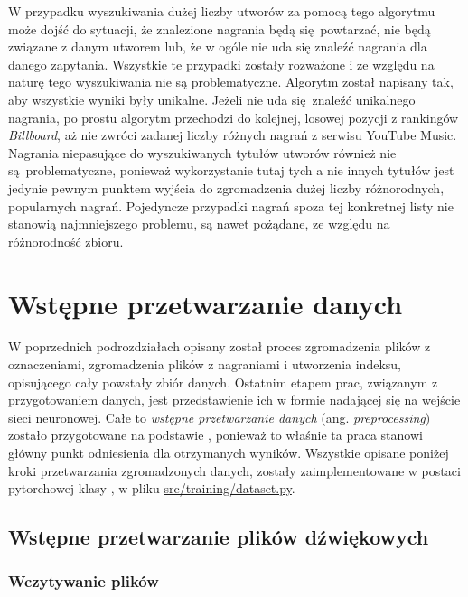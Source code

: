W przypadku wyszukiwania dużej liczby utworów za pomocą tego algorytmu może dojść do sytuacji, że znalezione nagrania będą się powtarzać, nie będą związane z danym utworem lub, że w ogóle nie uda się znaleźć nagrania dla danego zapytania. Wszystkie te przypadki zostały rozważone i ze względu na naturę tego wyszukiwania nie są problematyczne. Algorytm został napisany tak, aby wszystkie wyniki były unikalne. Jeżeli nie uda się znaleźć unikalnego nagrania, po prostu algorytm przechodzi do kolejnej, losowej pozycji z rankingów \emph{Billboard}, aż nie zwróci zadanej liczby różnych nagrań z serwisu YouTube Music. Nagrania niepasujące do wyszukiwanych tytułów utworów również nie są problematyczne, ponieważ wykorzystanie tutaj tych a nie innych tytułów jest jedynie pewnym punktem wyjścia do zgromadzenia dużej liczby różnorodnych, popularnych nagrań. Pojedyncze przypadki nagrań spoza tej konkretnej listy nie stanowią najmniejszego problemu, są nawet pożądane, ze względu na różnorodność zbioru.

\section{Wstępne przetwarzanie danych} \label{sec:preprocessing}

W poprzednich podrozdziałach opisany został proces zgromadzenia plików z oznaczeniami, zgromadzenia plików z nagraniami i utworzenia indeksu, opisującego cały powstały zbiór danych. Ostatnim etapem prac, związanym z przygotowaniem danych, jest przedstawienie ich w formie nadającej się na wejście sieci neuronowej. Całe to \emph{wstępne przetwarzanie danych} (ang. \emph{preprocessing}) zostało przygotowane na podstawie \cite{park_bi-directional_2019}, ponieważ to właśnie ta praca stanowi główny punkt odniesienia dla otrzymanych wyników. Wszystkie opisane poniżej kroki przetwarzania zgromadzonych danych, zostały zaimplementowane w postaci pytorchowej klasy , w pliku \url{src/training/dataset.py}.

\subsection{Wstępne przetwarzanie plików dźwiękowych}

\subsubsection{Wczytywanie plików}

